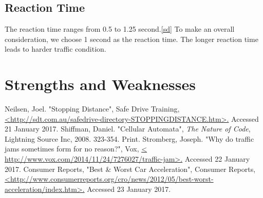 \documentclass[a4paper]{article}
\begin{document}
	\subsection{Reaction Time}
	The reaction time ranges from 0.5 to 1.25 second.\ref{sd} To make an overall consideration, we choose 1 second as the reaction time. The longer reaction time leads to harder traffic condition.
	\section{Strengths and Weaknesses}
	
	
	
	
	
	
	
	\begin{thebibliography}{0}
		 Neilsen, Joel. "Stopping Distance", Safe Drive Training,  \url{<http://sdt.com.au/safedrive-directory-STOPPINGDISTANCE.htm>.} Accessed 21 January 2017. 
		\bibitem{} Shiffman, Daniel. "Cellular Automata", \textit{The Nature of Code}, Lightning Source Inc, 2008. 323-354. Print.
		 Stromberg, Joseph. "Why do traffic jams sometimes form for no reason?", Vox, \url{< http://www.vox.com/2014/11/24/7276027/traffic-jam>.} Accessed 22 January 2017. 
		 Consumer Reports, "Best \& Worst Car Acceleration", Consumer Reports, \url{<http://www.consumerreports.org/cro/news/2012/05/best-worst-acceleration/index.htm>.} Accessed 23 January 2017.
	\end{thebibliography}
	
\end{document}
